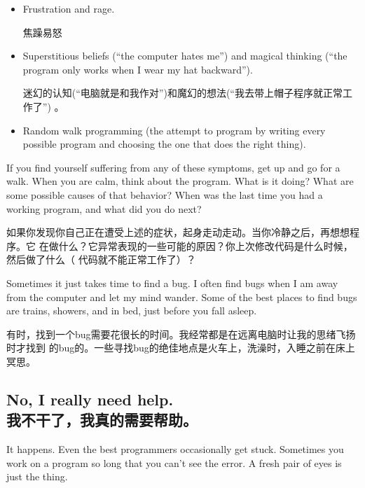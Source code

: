 \documentclass[10pt]{book}
\begin{document}
\begin{CJK}{UTF8}{gbsn}
\begin{itemize}

\item Frustration and rage.

焦躁易怒

\item Superstitious beliefs (``the computer hates me'') and
magical thinking (``the program only works when I wear my
hat backward'').

迷幻的认知(``电脑就是和我作对'')和魔幻的想法(``我去带上帽子程序就正常工作了'')
。

\item Random walk programming (the attempt to program by writing
every possible program and choosing the one that does the right
thing).

\end{itemize}

If you find yourself suffering from any of these symptoms, get
up and go for a walk.  When you are calm, think about the program.
What is it doing?  What are some possible causes of that
behavior?  When was the last time you had a working program,
and what did you do next?

如果你发现你自己正在遭受上述的症状，起身走动走动。当你冷静之后，再想想程序。它
在做什么？它异常表现的一些可能的原因？你上次修改代码是什么时候，然后做了什么（
代码就不能正常工作了）？

Sometimes it just takes time to find a bug.  I often find bugs
when I am away from the computer and let my mind wander.  Some
of the best places to find bugs are trains, showers, and in bed,
just before you fall asleep.

有时，找到一个bug需要花很长的时间。我经常都是在远离电脑时让我的思绪飞扬时才找到
的bug的。一些寻找bug的绝佳地点是火车上，洗澡时，入睡之前在床上冥思。

\subsection{No, I really need help.\\我不干了，我真的需要帮助。}

It happens.  Even the best programmers occasionally get stuck.
Sometimes you work on a program so long that you can't see the
error.  A fresh pair of eyes is just the thing.


\end{CJK}
\end{document}
